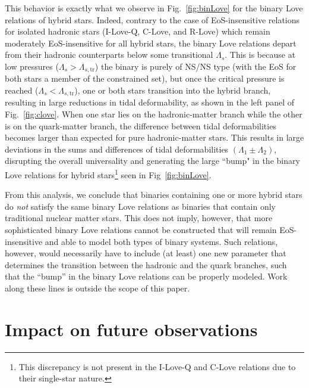 \documentclass[prd,twocolumn,nofootinbib,superscriptaddress,amsmath,amssymb]{revtex4-1}
\begin{document}
This behavior is exactly what we observe in Fig.~\ref{fig:binLove} for the binary Love relations of hybrid stars. Indeed, contrary to the case of EoS-insensitive relations for isolated hadronic stars (I-Love-Q, C-Love, and R-Love) which remain moderately EoS-insensitive for all hybrid stars, the binary Love relations depart from their hadronic counterparts below some transitional $\Lambda_{s}$. This is because at low pressures ($\Lambda_s>\Lambda_{s,\textrm{tr}}$) the binary is purely of NS/NS type (with the EoS for both stars a member of the constrained set), but once the critical pressure is reached ($\Lambda_{s}<\Lambda_{s,\textrm{tr}}$), one or both stars transition into the hybrid branch, resulting in large reductions in tidal deformability, as shown in the left panel of Fig.~\ref{fig:clove}. When one star lies on the hadronic-matter branch while the other is on the quark-matter branch, the difference between tidal deformabilities becomes larger than expected for pure hadronic-matter stars. This results in large deviations in the sums and differences of tidal deformabilities $(\Lambda_1 \pm \Lambda_2)$, disrupting the overall universality and generating the large ``bump" in the binary Love relations for hybrid stars\footnote{This discrepancy is not present in the I-Love-Q and C-Love relations due to their single-star nature.} seen in Fig~\ref{fig:binLove}.

From this analysis, we conclude that binaries containing one or more hybrid stars do \emph{not} satisfy the same binary Love relations as binaries that contain only traditional nuclear matter stars. This does not imply, however, that more sophisticated binary Love relations cannot be constructed that will remain EoS-insensitive and able to model both types of binary systems. Such relations, however, would necessarily have to include (at least) one new parameter that determines the transition between the hadronic and the quark branches, such that the ``bump'' in the binary Love relations can be properly modeled. Work along these lines is outside the scope of this paper. 


\section{Impact on future observations}
\label{sec:observations}
\end{document}
